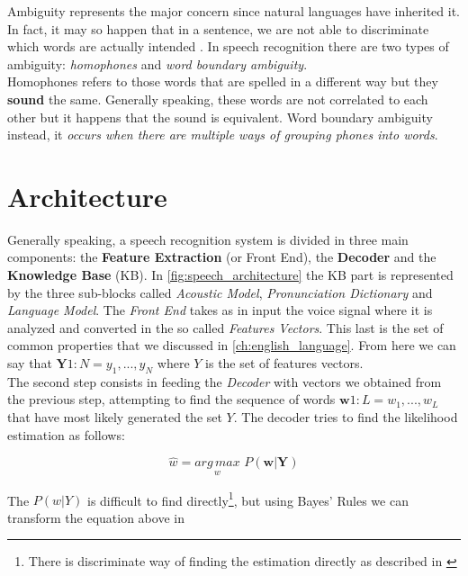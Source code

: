 \noindent Ambiguity represents the major concern since natural languages have inherited it. In fact, it may so happen that in a sentence, we are not able to discriminate which words are actually intended \cite{forsberg2003speech}. In speech recognition there are two types of ambiguity: \textit{homophones} and \textit{word boundary ambiguity}. \\
Homophones refers to those words that are spelled in a different way but they \textbf{sound} the same. Generally speaking, these words are not correlated to each other but it happens that the sound is equivalent. Word boundary ambiguity instead, it \textit{occurs when there are multiple ways of grouping phones into words}\cite{forsberg2003speech}.

\section{Architecture}
\label{sec:speech_rec_Architecture}
Generally speaking, a speech recognition system is divided in three main components: the \textbf{Feature Extraction} (or Front End), the \textbf{Decoder} and the \textbf{Knowledge Base} (KB). In \ref{fig:speech_architecture} the KB part is represented by the three sub-blocks called \textit{Acoustic Model}, \textit{Pronunciation Dictionary} and \textit{Language Model}. The \textit{Front End} takes as in input the voice signal where it is analyzed and converted in the so called \textit{Features Vectors}. This last is the set of common properties that we discussed in \ref{ch:english_language}. From here we can say that $\textbf{Y} 1:N = y_{1},..., y_{N}$ where $Y$ is the set of features vectors. \\
The second step consists in feeding the \textit{Decoder} with vectors we obtained from the previous step, attempting to find the sequence of words $\textbf{w} 1:L = w_{1}, ... , w_{L}$ that have most likely generated the set $Y$\cite{gales2008application}. The decoder tries to find the likelihood estimation as follows:

\begin{equation}
	\widehat{w} = \underset{w}{arg \, max} \,\, P(\textbf{w}| \textbf{Y})
\end{equation}

\noindent The $P (w|Y)$ is difficult to find directly\footnote{There is discriminate way of finding the estimation directly as described in \cite{gales2007discriminative}}, but using Bayes' Rules we can transform the equation above in

